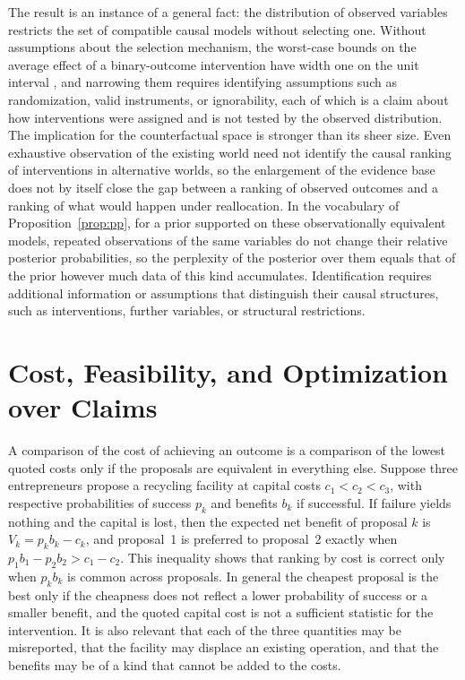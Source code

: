\documentclass[11pt]{article}
\theoremstyle{definition}
\theoremstyle{remark}
\begin{document}
The result is an instance of a general fact: the distribution of observed variables restricts the set of compatible causal models without selecting one. Without assumptions about the selection mechanism, the worst-case bounds on the average effect of a binary-outcome intervention have width one on the unit interval \citep{manski1990}, and narrowing them requires identifying assumptions such as randomization, valid instruments, or ignorability, each of which is a claim about how interventions were assigned and is not tested by the observed distribution. The implication for the counterfactual space is stronger than its sheer size. Even exhaustive observation of the existing world need not identify the causal ranking of interventions in alternative worlds, so the enlargement of the evidence base does not by itself close the gap between a ranking of observed outcomes and a ranking of what would happen under reallocation. In the vocabulary of Proposition~\ref{prop:pp}, for a prior supported on these observationally equivalent models, repeated observations of the same variables do not change their relative posterior probabilities, so the perplexity of the posterior over them equals that of the prior however much data of this kind accumulates. Identification requires additional information or assumptions that distinguish their causal structures, such as interventions, further variables, or structural restrictions.

\section{Cost, Feasibility, and Optimization over Claims}
\label{sec:cost}

A comparison of the cost of achieving an outcome is a comparison of the lowest quoted costs only if the proposals are equivalent in everything else. Suppose three entrepreneurs propose a recycling facility at capital costs $c_1<c_2<c_3$, with respective probabilities of success $p_k$ and benefits $b_k$ if successful. If failure yields nothing and the capital is lost, then the expected net benefit of proposal $k$ is $V_k=p_kb_k-c_k$, and proposal~1 is preferred to proposal~2 exactly when $p_1b_1-p_2b_2>c_1-c_2$. This inequality shows that ranking by cost is correct only when $p_kb_k$ is common across proposals. In general the cheapest proposal is the best only if the cheapness does not reflect a lower probability of success or a smaller benefit, and the quoted capital cost is not a sufficient statistic for the intervention. It is also relevant that each of the three quantities may be misreported, that the facility may displace an existing operation, and that the benefits may be of a kind that cannot be added to the costs.
\end{document}

